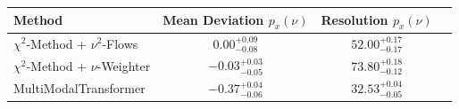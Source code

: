     \begin{tabular}{lccc}
        \toprule
        Method & Mean Deviation $p_{x}(\nu)$ & Resolution $p_{x}(\nu)$ \\
        \midrule
        $\chi^2$-Method + $\nu^2$-Flows & $0.00^{+0.09}_{-0.08}$ & $52.00^{+0.17}_{-0.17}$ \\
        $\chi^2$-Method + $\nu$-Weighter & $-0.03^{+0.03}_{-0.05}$ & $73.80^{+0.18}_{-0.12}$ \\
        MultiModalTransformer & $-0.37^{+0.04}_{-0.06}$ & $32.53^{+0.04}_{-0.05}$ \\
        \bottomrule
    \end{tabular}